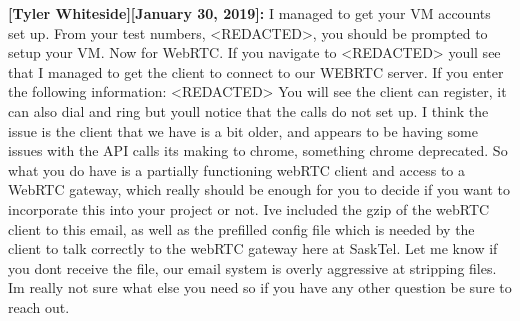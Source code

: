 \documentclass[12pt]{article}
\begin{document}
\textbf{[Tyler Whiteside][January 30, 2019]:} I managed to get your VM accounts set up. From your test numbers, <REDACTED>, you should be prompted to setup your VM. Now for WebRTC. If you navigate to <REDACTED> youll see that I managed to get the client to connect to our WEBRTC server. If you enter the following information: <REDACTED> You will see the client can register, it can also dial and ring but youll notice that the calls do not set up.  I think the issue is the client that we have is a bit older, and appears to be having some issues with the API calls its making to chrome, something chrome deprecated.
So what you do have is a partially functioning webRTC client and access to a WebRTC gateway, which really should be enough for you to decide if you want to incorporate this into your project or not.
Ive included the gzip of the webRTC client to this email, as well as the prefilled config file which is needed by the client to talk correctly to the webRTC gateway here at SaskTel. Let me know if you dont receive the file, our email system is overly aggressive at stripping files. Im really not sure what else you need so if you have any other question be sure to reach out.
\end{document}
